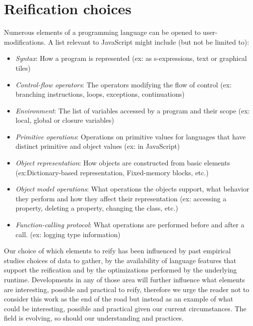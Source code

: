 \section{Reification choices}

Numerous elements of a programming language can be opened to
user-modifications. A list relevant to JavaScript might include (but not be
limited to):
\begin{itemize}
    \item \textit{Syntax}: How a program is represented (ex: as s-expressions,
    text or graphical tiles)
    \item \textit{Control-flow operators}: The operators modifying the flow of
    control (ex: branching instructions, loops, exceptions, continuations) 
    \item \textit{Environment}: The list of variables accessed by a program and
    their scope (ex: local, global or closure variables)
    \item \textit{Primitive operations}: Operations on primitive values for
    languages that have distinct primitive and object values (ex: \kw{+} in
    JavaScript) 
    \item \textit{Object representation}: How objects are constructed from
    basic elements (ex:Dictionary-based representation, Fixed-memory blocks, etc.)
    \item \textit{Object model operations}: What operations the objects
    support, what behavior they perform and how they affect their
    representation (ex: accessing a property, deleting a property, changing the
    class, etc.)
    \item \textit{Function-calling protocol}: What operations are performed
    before and after a call. (ex: logging type information)
\end{itemize}

Our choice of which elements to reify has been influenced by past empirical
studies choices of data to gather, by the availability of language features
that support the reification and by the optimizations performed by the
underlying runtime. Developments in any of those area will further influence
what elements are interesting, possible and practical to reify, therefore we
urge the reader not to consider this work as the end of the road but instead as
an example of what could be interesting, possible and practical given our
current circumstances. The field is evolving, so should our understanding and
practices.

